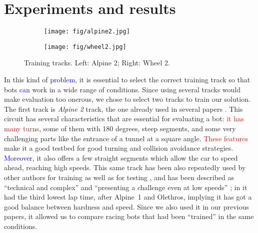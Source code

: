 \documentclass[10pt,journal,compsoc]{IEEEtran}
\begin{document}
\section{Experiments and results}  
\label{sec:results}

%
\begin{figure}[!ht]	
\centering
\begin{subfigure}[b]{0.15\textwidth}
	\centering
	\texttt{[image: fig/alpine2.jpg]}
	\label{fig:alpine2}
\end{subfigure}
\hfill
\begin{subfigure}[b]{0.15\textwidth}
	\centering
	\texttt{[image: fig/wheel2.jpg]}
	\label{fig:wheel2}
\end{subfigure}
\caption{Training tracks. Left: Alpine 2; Right: Wheel 2.}
\label{fig:alpine2_wheel2track}
\end{figure}

In this kind of \textcolor{blue}{problem}, it is essential to select the correct
training track so that bots \textcolor{blue}{can} work in a wide range of
conditions. Since using several tracks would make evaluation too onerous, we chose to select two tracks to train our solution. The first track is \textit{Alpine 2} track, the one already used in several papers  \cite{salem_cig2018,DBLP:conf/cig/SalemMG19}. This circuit has several characteristics that
are essential for evaluating a bot: \textcolor{red}{it has many turns}, some of
them with 180 degrees, steep segments, and some very challenging parts
like the entrance of a tunnel at a square angle. \textcolor{red}{ These features} make
it a good testbed for good turning and collision avoidance
strategies. \textcolor{blue}{Moreover,} it also offers a few straight segments which allow the car to speed ahead, reaching high speeds. This same track has been also repeatedly used by other authors for training as well as for testing \cite{cardamone2010applying}, and has been described as ``technical and complex'' \cite{AG} and ``presenting a challenge even at low speeds'' \cite{vrajitoru2018global}; in \cite{AG} it had the third lowest lap time, after \mbox{Alpine 1} and Olethros, implying it has got a good balance between hardness and speed. Since we also used it in our previous papers, it allowed us to compare racing bots that had been ``trained'' in the same conditions.
\end{document}
